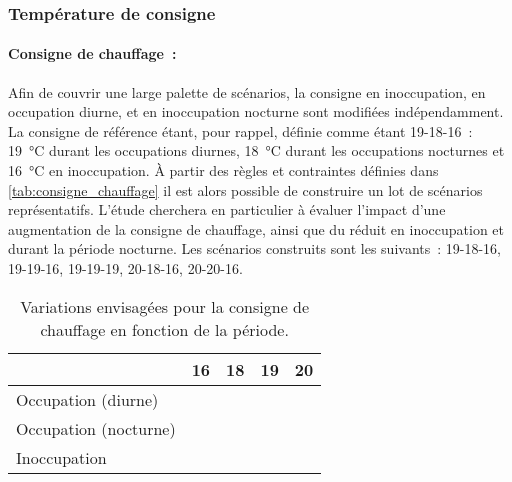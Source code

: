 \subsubsection{Température de consigne} %
\label{ssub:temperature_de_consigne}
\paragraph{Consigne de chauffage~:} %
\label{par:consigne_de_chauffage}
Afin de couvrir une large palette de scénarios, la consigne en inoccupation, en occupation
diurne, et en inoccupation nocturne sont modifiées indépendamment. La consigne de
référence étant, pour rappel, définie comme étant 19-18-16~: \SI{19}{\celsius} durant les
occupations diurnes, \SI{18}{\celsius} durant les occupations nocturnes et
\SI{16}{\celsius} en inoccupation. À partir des règles et contraintes définies dans
\autoref{tab:consigne_chauffage} il est alors possible de construire un lot de scénarios
représentatifs. L’étude cherchera en particulier à évaluer l’impact d’une augmentation de
la consigne de chauffage, ainsi que du réduit en inoccupation et durant la période
nocturne. Les scénarios construits sont les suivants~: 19-18-16, 19-19-16, 19-19-19,
20-18-16, 20-20-16.

\begin{table}
\centering
\begin{tabular}{l c c c c}
    \toprule
                           & \bf{16}                     & \bf{18}                     & \bf{19}                     & \bf{20}              \\
    \midrule
    Occupation (diurne)    &                             &                             & \cellcolor{SolarizedBrBlue} & \cellcolor{SolarizedBrBlue} \\
    Occupation (nocturne)  &                             & \cellcolor{SolarizedBrBlue} & \cellcolor{SolarizedBrBlue} & \cellcolor{SolarizedBrBlue} \\
    Inoccupation           & \cellcolor{SolarizedBrBlue} &                             & \cellcolor{SolarizedBrBlue} &                     \\
    \bottomrule
\end{tabular}
\caption{Variations envisagées pour la consigne de chauffage en fonction de la période.}
         \label{tab:consigne_chauffage}
\end{table}


